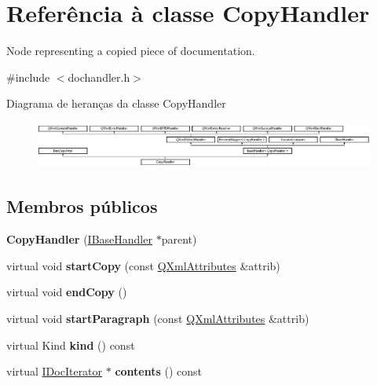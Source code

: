 \hypertarget{class_copy_handler}{\section{Referência à classe Copy\-Handler}
\label{class_copy_handler}
}


Node representing a copied piece of documentation.  




{\ttfamily \#include $<$dochandler.\-h$>$}

Diagrama de heranças da classe Copy\-Handler\begin{figure}[H]
\begin{center}
\leavevmode
\includegraphics[height=1.545894cm]{class_copy_handler}
\end{center}
\end{figure}
\subsection*{Membros públicos}
\begin{DoxyCompactItemize}
\item 
\hypertarget{class_copy_handler_a63681e25537a6b1c4b5f25d45423cb13}{{\bfseries Copy\-Handler} (\hyperlink{class_i_base_handler}{I\-Base\-Handler} $\ast$parent)}\label{class_copy_handler_a63681e25537a6b1c4b5f25d45423cb13}

\item 
\hypertarget{class_copy_handler_a2bb03e75295578cb36a0a27fa88d2960}{virtual void {\bfseries start\-Copy} (const \hyperlink{class_q_xml_attributes}{Q\-Xml\-Attributes} \&attrib)}\label{class_copy_handler_a2bb03e75295578cb36a0a27fa88d2960}

\item 
\hypertarget{class_copy_handler_a0a534651c87cb23d6c08da6f1b4c33f8}{virtual void {\bfseries end\-Copy} ()}\label{class_copy_handler_a0a534651c87cb23d6c08da6f1b4c33f8}

\item 
\hypertarget{class_copy_handler_abb7f955561480002949ada58092c1964}{virtual void {\bfseries start\-Paragraph} (const \hyperlink{class_q_xml_attributes}{Q\-Xml\-Attributes} \&attrib)}\label{class_copy_handler_abb7f955561480002949ada58092c1964}

\item 
\hypertarget{class_copy_handler_af8e62c8a81ddf2283205cc8955de50eb}{virtual Kind {\bfseries kind} () const }\label{class_copy_handler_af8e62c8a81ddf2283205cc8955de50eb}

\item 
\hypertarget{class_copy_handler_a6f867db5d47aa2210c77df9bc5953008}{virtual \hyperlink{class_i_doc_iterator}{I\-Doc\-Iterator} $\ast$ {\bfseries contents} () const }\label{class_copy_handler_a6f867db5d47aa2210c77df9bc5953008}

\end{DoxyCompactItemize}
